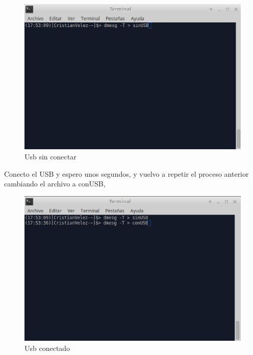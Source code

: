 \begin{figure}[H] %
	\centering
	\includegraphics[scale=0.5]{pics/USB1.png}  %
	\caption{Usb sin conectar} \label{fig:usb1}
\end{figure}

Conecto el USB y espero unos segundos, y vuelvo a repetir el proceso anterior cambiando el archivo a conUSB,

\begin{figure}[H] %
	\centering
	\includegraphics[scale=0.5]{pics/USB2.png}  %
	\caption{Usb conectado} \label{fig:usb2}
\end{figure}

